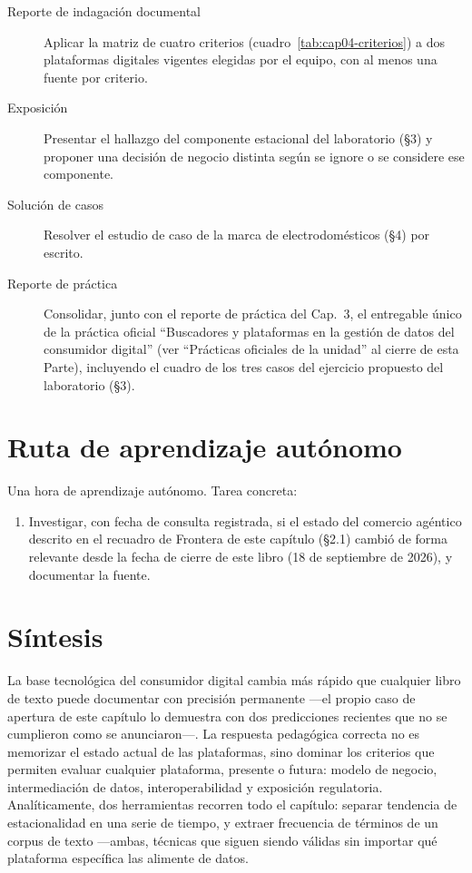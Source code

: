 \begin{description}
  \item[Reporte de indagación documental] Aplicar la matriz de cuatro
  criterios (cuadro~\ref{tab:cap04-criterios}) a dos plataformas digitales
  vigentes elegidas por el equipo, con al menos una fuente por criterio.
  \item[Exposición] Presentar el hallazgo del componente estacional del
  laboratorio (§3) y proponer una decisión de negocio distinta según se
  ignore o se considere ese componente.
  \item[Solución de casos] Resolver el estudio de caso de la marca de
  electrodomésticos (§4) por escrito.
  \item[Reporte de práctica] Consolidar, junto con el reporte de práctica
  del Cap.~3, el entregable único de la práctica oficial \enquote{Buscadores
  y plataformas en la gestión de datos del consumidor digital} (ver
  \enquote{Prácticas oficiales de la unidad} al cierre de esta Parte),
  incluyendo el cuadro de los tres casos del ejercicio propuesto del
  laboratorio (§3).
\end{description}

\section{Ruta de aprendizaje autónomo}

Una hora de aprendizaje autónomo. Tarea concreta:
\begin{enumerate}
  \item Investigar, con fecha de consulta registrada, si el estado del
  comercio agéntico descrito en el recuadro de Frontera de este capítulo
  (§2.1) cambió de forma relevante desde la fecha de cierre de este libro
  (18 de septiembre de 2026), y documentar la fuente.
\end{enumerate}

\section{Síntesis}

La base tecnológica del consumidor digital cambia más rápido que cualquier
libro de texto puede documentar con precisión permanente —el propio caso de
apertura de este capítulo lo demuestra con dos predicciones recientes que no
se cumplieron como se anunciaron—. La respuesta pedagógica correcta no es
memorizar el estado actual de las plataformas, sino dominar los criterios
que permiten evaluar cualquier plataforma, presente o futura: modelo de
negocio, intermediación de datos, interoperabilidad y exposición
regulatoria. Analíticamente, dos herramientas recorren todo el capítulo:
separar tendencia de estacionalidad en una serie de tiempo, y extraer
frecuencia de términos de un corpus de texto —ambas, técnicas que siguen
siendo válidas sin importar qué plataforma específica las alimente de
datos.

